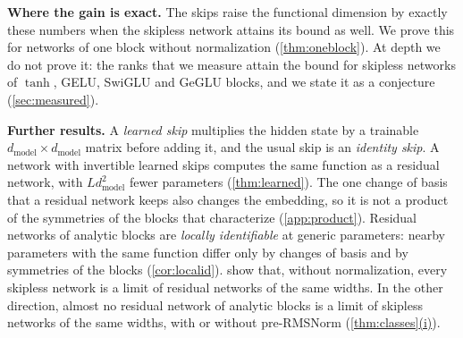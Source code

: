 \documentclass[10pt]{article}
\theoremstyle{definition}
\theoremstyle{remark}
\newcommand{\dm}{d_{\mathrm{model}}}
\newcommand{\para}[1]{\smallskip\noindent\textbf{#1}\hspace{0.5em}}
\DeclareRobustCommand{\cpref}[2]{\hyperref[#1:#2]{\cref*{#1}(#2)}}
\begin{document}
\para{Where the gain is exact.} The skips raise the functional dimension by exactly these numbers when the skipless network attains its bound as well. We prove this for networks of one block without normalization (\cref{thm:oneblock}). At depth we do not prove it: the ranks that we measure attain the bound for skipless networks of $\tanh$, GELU, SwiGLU and GeGLU blocks, and we state it as a conjecture (\cref{sec:measured}).

\para{Further results.} A \emph{learned skip} multiplies the hidden state by a trainable $\dm\times\dm$ matrix before adding it, and the usual skip is an \emph{identity skip}. A network with invertible learned skips computes the same function as a residual network, with $L\dm^2$ fewer parameters (\cref{thm:learned}). The one change of basis that a residual network keeps also changes the embedding, so it is not a product of the symmetries of the blocks that \citet{wang2025gauge} characterize (\cref{app:product}). Residual networks of analytic blocks are \emph{locally identifiable} at generic parameters: nearby parameters with the same function differ only by changes of basis and by symmetries of the blocks (\cref{cor:localid}). \citet{mijoski2026worth} show that, without normalization, every skipless network is a limit of residual networks of the same widths. In the other direction, almost no residual network of analytic blocks is a limit of skipless networks of the same widths, with or without pre-RMSNorm (\cpref{thm:classes}{i}).
\end{document}
